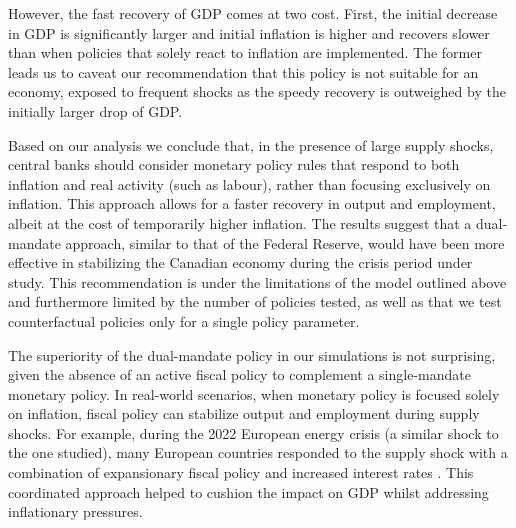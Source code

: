 \documentclass[12pt]{article}
\begin{document}
However, the fast recovery of GDP comes at two cost. First, the initial decrease in GDP is significantly larger and initial inflation is higher and recovers slower than when policies that solely react to inflation are implemented. The former leads us to caveat our recommendation that this policy is not suitable for an economy, exposed to frequent shocks as the speedy recovery is outweighed by the initially larger drop of GDP. 

Based on our analysis we conclude that, in the presence of large supply shocks, central banks should consider monetary policy rules that respond to both inflation and real activity (such as labour), rather than focusing exclusively on inflation. This approach allows for a faster recovery in output and employment, albeit at the cost of temporarily higher inflation. The results suggest that a dual-mandate approach, similar to that of the Federal Reserve, would have been more effective in stabilizing the Canadian economy during the crisis period under study. This recommendation is under the limitations of the model outlined above and furthermore limited by the number of policies tested, as well as that we test counterfactual policies only for a single policy parameter. 

The superiority of the dual-mandate policy in our simulations is not surprising, given the absence of an active fiscal policy to complement a single-mandate monetary policy. In real-world scenarios, when monetary policy is focused solely on inflation, fiscal policy can stabilize output and employment during supply shocks. For example, during the 2022 European energy crisis (a similar shock to the one studied), many European countries responded to the supply shock with a combination of expansionary fiscal policy and increased interest rates \parencite{bankoffinlandEuropeanCentralBanks2022, checherita-westphalUpdateEuroArea2023}. This coordinated approach helped to cushion the impact on GDP whilst addressing inflationary pressures.
\newpage %
\printbibliography{} %

\newpage
\appendix
\end{document}
